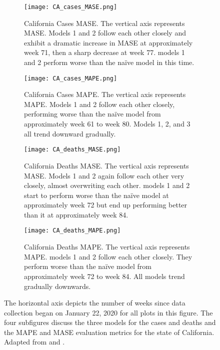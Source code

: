 \begin{figure}
\centering
\begin{subfigure}[t]{0.45\textwidth}
\texttt{[image: CA\_cases\_MASE.png]}
\caption{California Cases {MASE}. The vertical axis represents MASE. Models 1 and 2 follow each other closely and exhibit a dramatic increase in {MASE} at approximately week 71, then a sharp decrease at week 77. models 1 and 2 perform worse than the na\"ive model in this time.}
\end{subfigure}\hfill
\begin{subfigure}[t]{0.45\textwidth}
\texttt{[image: CA\_cases\_MAPE.png]}
\caption{California Cases {MAPE}. The vertical axis represents MAPE. Models 1 and 2 follow each other closely, performing worse than the na\"ive model from approximately week 61 to week 80. Models 1, 2, and 3 all trend downward gradually.}
\end{subfigure}
\begin{subfigure}[t]{0.45\textwidth}
\texttt{[image: CA\_deaths\_MASE.png]}
\caption{California Deaths {MASE}. The vertical axis represents MASE. Models 1 and 2 again follow each other very closely, almost overwriting each other. models 1 and 2 start to perform worse than the na\"ive model at approximately week 72 but end up performing better than it at approximately week 84.}
\end{subfigure}\hfill
\begin{subfigure}[t]{0.45\textwidth}
\texttt{[image: CA\_deaths\_MAPE.png]}
\caption{California Deaths {MAPE}. The vertical axis represents MAPE. models 1 and 2 follow each other closely. They perform worse than the na\"ive model from approximately week 72 to week 84. All models trend gradually downwards.}
\end{subfigure}
\caption{The horizontal axis depicts the number of weeks since data collection began on January 22, 2020 for all plots in this figure. The four subfigures discuss the three models for the cases and deaths and the MAPE and MASE evaluation metrics for the state of California. Adapted from \cite{USCB:2019} and \cite{USAFacts:2021a}.
}
\label{fig:CA}
\end{figure}




